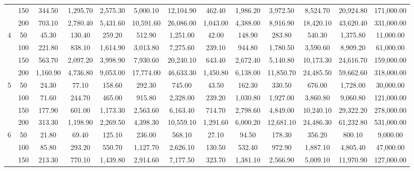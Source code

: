 \begin{table}[htbp]
\begin{adjustbox}{angle=90}
{\begin{tabular}{|c|c|c|c|c|c|c|c|c|c|c|c|c|}
     & 150 & 344.50 & 1,295.70 & 2,575.30 & 5,000.10 & 12,104.90 & 462.40 & 1,986.20 & 3,972.50 & 8,524.70 & 20,924.80                            & 171,000.00 \\
     & 200 & 703.10 & 2,780.40 & 5,431.60 & 10,591.60 & 26,086.00 & 1,043.00 & 4,388.00 & 8,916.90 & 18,420.10 & 43,620.40                        & 331,000.00 \\ \hline
    4 & 50 & 45.30 & 130.40 & 259.20 & 512.90 & 1,251.00 & 42.00 & 148.90 & 283.80 & 540.30 & 1,375.80                                            & 11,000.00 \\
     & 100 & 221.80 & 838.10 & 1,614.90 & 3,013.80 & 7,275.60 & 239.10 & 944.80 & 1,780.50 & 3,590.60 & 8,909.20                                  & 61,000.00 \\
     & 150 & 563.70 & 2,097.20 & 3,998.90 & 7,930.60 & 20,240.10 & 643.40 & 2,672.40 & 5,140.80 & 10,173.30 & 24,616.70                           & 159,000.00 \\
     & 200 & 1,160.90 & 4,736.80 & 9,053.00 & 17,774.00 & 46,633.30 & 1,450.80 & 6,138.00 & 11,850.70 & 24,485.50 & 59,662.60                     & 318,000.00 \\ \hline
    5 & 50 & 24.30 & 77.10 & 158.60 & 292.30 & 745.00 & 43.50 & 162.30 & 330.50 & 676.00 & 1,728.00                                               & 30,000.00 \\
     & 100 & 71.60 & 244.70 & 465.00 & 915.80 & 2,328.00 & 239.20 & 1,030.80 & 1,927.00 & 3,860.80 & 9,060.80                                     & 121,000.00 \\
     & 150 & 177.90 & 601.00 & 1,173.30 & 2,563.60 & 6,163.40 & 714.70 & 2,798.60 & 4,849.00 & 10,240.10 & 29,322.20                              & 278,000.00 \\
     & 200 & 313.30 & 1,198.90 & 2,269.50 & 4,398.30 & 10,559.10 & 1,291.60 & 6,000.20 & 12,681.10 & 24,486.30 & 61,232.80                        & 531,000.00 \\ \hline
    6 & 50 & 21.80 & 69.40 & 125.10 & 236.00 & 568.10 & 27.10 & 94.50 & 178.30 & 356.20 & 800.10                                                  & 9,000.00 \\
     & 100 & 85.80 & 293.20 & 550.70 & 1,127.70 & 2,626.10 & 130.50 & 532.40 & 972.90 & 1,887.10 & 4,805.40                                       & 47,000.00 \\
     & 150 & 213.30 & 770.10 & 1,439.80 & 2,914.60 & 7,177.50 & 323.70 & 1,381.10 & 2,566.90 & 5,009.10 & 11,970.90                               & 127,000.00 \\

\end{tabular}}
\end{adjustbox}
\end{table}
